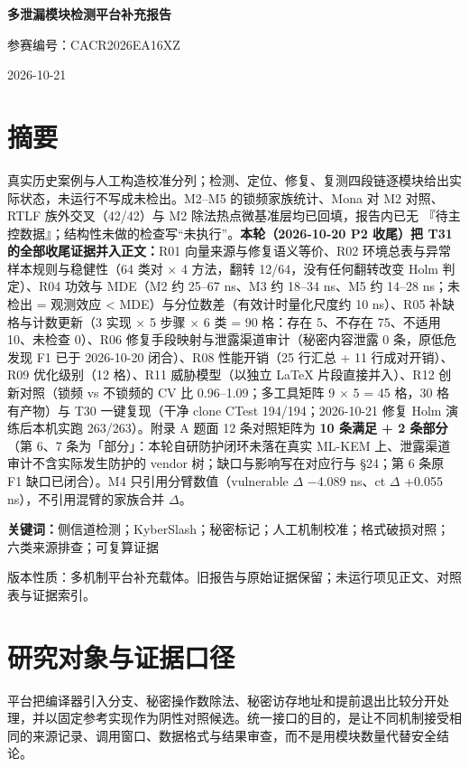 \documentclass[UTF8,fontset=fandol,11pt,a4paper]{ctexart}
\begin{document}
\thispagestyle{empty}\vspace*{16mm}\begin{center}{\LARGE\bfseries 多泄漏模块检测平台补充报告\par}\vspace{8mm}{\large 统一检测、定位、修复与复测的证据分层\par}\vspace{9mm}参赛编号：CACR2026EA16XZ\par 2026-10-21\end{center}\vspace{12mm}
\section*{摘要}
真实历史案例与人工构造校准分列；检测、定位、修复、复测四段链逐模块给出实际状态，未运行不写成未检出。M2–M5 的锁频家族统计、Mona 对 M2 对照、RTLF 族外交叉（42/42）与 M2 除法热点微基准层均已回填，报告内已无 『待主控数据』；结构性未做的检查写“未执行”。\textbf{本轮（2026-10-20 P2 收尾）把 T31 的全部收尾证据并入正文：}R01 向量来源与修复语义等价、R02 环境总表与异常样本规则与稳健性（64 类对 \texorpdfstring{$\times$}{x} 4 方法，翻转 12/64，没有任何翻转改变 Holm 判定）、R04 功效与 MDE（M2 约 25–67 ns、M3 约 18–34 ns、M5 约 14–28 ns；未检出 = 观测效应 < MDE）与分位数差（有效计时量化尺度约 10 ns）、R05 补缺格与计数更新（3 实现 \texorpdfstring{$\times$}{x} 5 步骤 \texorpdfstring{$\times$}{x} 6 类 = 90 格：存在 5、不存在 75、不适用 10、未检查 0）、R06 修复手段映射与泄露渠道审计（秘密内容泄露 0 条，原低危发现 F1 已于 2026-10-20 闭合）、R08 性能开销（25 行汇总 + 11 行成对开销）、R09 优化级别（12 格）、R11 威胁模型（以独立 LaTeX 片段直接并入）、R12 创新对照（锁频 vs 不锁频的 CV 比 0.96–1.09；多工具矩阵 9 \texorpdfstring{$\times$}{x} 5 = 45 格，30 格有产物）与 T30 一键复现（干净 clone CTest 194/194；2026-10-21 修复 Holm 演练后本机实跑 263/263）。附录 A 题面 12 条对照矩阵为 \textbf{10 条满足 + 2 条部分}（第 6、7 条为「部分」：本轮自研防护闭环未落在真实 ML-KEM 上、泄露渠道审计不含实际发生防护的 vendor 树；缺口与影响写在对应行与 §24；第 6 条原 F1 缺口已闭合）。M4 只引用分臂数值（vulnerable \texorpdfstring{$\Delta$}{Delta} \texorpdfstring{$-$}{-}4.089 ns、ct \texorpdfstring{$\Delta$}{Delta} +0.055 ns），不引用混臂的家族合并 \texorpdfstring{$\Delta$}{Delta}。
\par\vspace{6mm}\noindent\textbf{关键词：}侧信道检测；KyberSlash；秘密标记；人工机制校准；格式破损对照；六类来源排查；可复算证据
\par\vspace{6mm}\noindent 版本性质：多机制平台补充载体。旧报告与原始证据保留；未运行项见正文、对照表与证据索引。
\clearpage\section{研究对象与证据口径}
平台把编译器引入分支、秘密操作数除法、秘密访存地址和提前退出比较分开处理，并以固定参考实现作为阴性对照候选。统一接口的目的，是让不同机制接受相同的来源记录、调用窗口、数据格式与结果审查，而不是用模块数量代替安全结论。
\end{document}

